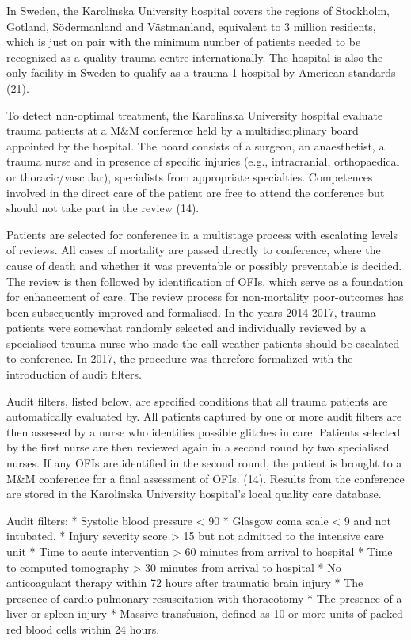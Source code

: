 \documentclass[
]{article}
\begin{document}
In Sweden, the Karolinska University hospital covers the regions of
Stockholm, Gotland, Södermanland and Västmanland, equivalent to 3
million residents, which is just on pair with the minimum number of
patients needed to be recognized as a quality trauma centre
internationally. The hospital is also the only facility in Sweden to
qualify as a trauma-1 hospital by American standards (21).

To detect non-optimal treatment, the Karolinska University hospital
evaluate trauma patients at a M\&M conference held by a
multidisciplinary board appointed by the hospital. The board consists of
a surgeon, an anaesthetist, a trauma nurse and in presence of specific
injuries (e.g., intracranial, orthopaedical or thoracic/vascular),
specialists from appropriate specialties. Competences involved in the
direct care of the patient are free to attend the conference but should
not take part in the review (14).

Patients are selected for conference in a multistage process with
escalating levels of reviews. All cases of mortality are passed directly
to conference, where the cause of death and whether it was preventable
or possibly preventable is decided. The review is then followed by
identification of OFIs, which serve as a foundation for enhancement of
care. The review process for non-mortality poor-outcomes has been
subsequently improved and formalised. In the years 2014-2017, trauma
patients were somewhat randomly selected and individually reviewed by a
specialised trauma nurse who made the call weather patients should be
escalated to conference. In 2017, the procedure was therefore formalized
with the introduction of audit filters.

Audit filters, listed below, are specified conditions that all trauma
patients are automatically evaluated by. All patients captured by one or
more audit filters are then assessed by a nurse who identifies possible
glitches in care. Patients selected by the first nurse are then reviewed
again in a second round by two specialised nurses. If any OFIs are
identified in the second round, the patient is brought to a M\&M
conference for a final assessment of OFIs. (14). Results from the
conference are stored in the Karolinska University hospital's local
quality care database.

Audit filters: * Systolic blood pressure \textless{} 90 * Glasgow coma
scale \textless{} 9 and not intubated. * Injury severity score
\textgreater{} 15 but not admitted to the intensive care unit * Time to
acute intervention \textgreater{} 60 minutes from arrival to hospital *
Time to computed tomography \textgreater{} 30 minutes from arrival to
hospital * No anticoagulant therapy within 72 hours after traumatic
brain injury * The presence of cardio-pulmonary resuscitation with
thoracotomy * The presence of a liver or spleen injury * Massive
transfusion, defined as 10 or more units of packed red blood cells
within 24 hours.
\end{document}

